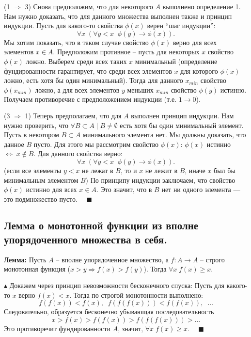 \par (1 $\Rightarrow$ 3) Снова предположим, что для
некоторого $A$ выполнено определение 1. Нам нужно доказать, что для данного множества выполнен также и принцип индукции. Пусть для какого-то свойства $\phi(x)$ верен “шаг индукции”: $$\forall x \; (\forall y<x \;\; \phi(y)\to \phi(x) ).$$
Мы хотим показать, что в таком случае свойство $\phi(x)$ верно для всех элементов $x \in A$. Предположим противное – пусть для некоторых $x$ свойство $\phi(x)$ ложно. Выберем среди всех таких $x$ минимальный (определение фундированности гарантирует, что среди всех элементов $x$ для которого $\phi(x)$ ложно, есть хотя бы один минимальный). Тогда для данного $x_{min}$ свойство $\phi(x_{min})$ ложно, а для всех элементов $y$ меньших $x_{min}$ свойство $\phi(y)$ истинно. Получаем противоречие с предположением индукции (т.е. $1\to 0$).

\par (3 $\Rightarrow$ 1) Теперь предполагаем, что для
$A$ выполнен принцип индукции. Нам нужно проверить, что $\forall B\subset A \; | \; B\neq \emptyset$ есть хотя бы один минимальный элемент. Пусть в некотором $B\subset A$ минимального элемента нет. Мы должны доказать, что данное $B$ пусто. Для этого мы рассмотрим свойство $\phi(x)$\;: $\phi(x)$ истинно $\Leftrightarrow \; x\notin B$. Для данного свойства верно: $$\forall x \; (\forall y<x \;\; \phi(y)\to \phi(x) ).$$ 
(если все элементы $y<x$ не лежат в $B$, то и $x$ не лежит в $B$, иначе $x$ был бы минимальным элементом $B$) По принципу индукции заключаем, что свойство $\phi(x)$ истинно для всех $x\in A$. Это значит, что в $B$ нет ни одного
элемента — это подмножество пусто. $\quad \blacksquare$

\subsection{Лемма о монотонной функции из вполне упорядоченного множества в себя.}

\textbf{Лемма:} Пусть $A$ -- вполне упорядоченное множество, а $f:A\to A$ -- строго монотонная функция ($x>y \Rightarrow f(x)>f(y)$). Тогда $\forall x \; f(x)\geqslant x$.

$\blacktriangle$ Докажем через принцип невозможности бесконечного спуска:
\newline Пусть для какого-то $x$ верно $f(x)<x$. Тогда по строгой монотонности выполнено: $$f(f(x))<f(x),\;\; f(f(f(x)))<f(f(x)),\;\; \ldots$$ Следовательно, образуется бесконечно убывающая последовательность $$x>f(x)>f(f(x))>f(f(f(x)))>\ldots$$ Это противоречит фундированности $A$, значит, $\forall x \; f(x)\geqslant x$. $\quad \blacksquare$

